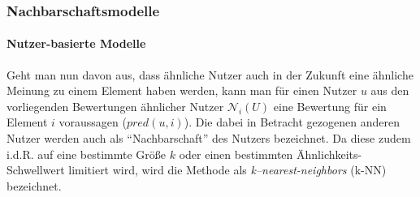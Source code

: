 \subsubsection{Nachbarschaftsmodelle}\label{sec:neighborhoods}

\paragraph{Nutzer-basierte Modelle} Geht man nun davon aus, dass ähnliche Nutzer auch in der Zukunft eine ähnliche Meinung zu einem Element haben werden, kann man für einen Nutzer $u$ aus den vorliegenden Bewertungen ähnlicher Nutzer $\mathcal{N}_i(U)$ eine Bewertung für ein Element $i$ voraussagen ($pred(u,i)$). Die dabei in Betracht gezogenen anderen Nutzer werden auch als ``Nachbarschaft'' des Nutzers bezeichnet. Da diese zudem i.d.R. auf eine bestimmte Größe $k$ oder einen bestimmten Ähnlichkeits-Schwellwert limitiert wird, wird die Methode als \textit{k--nearest-neighbors} (k-NN) bezeichnet.

